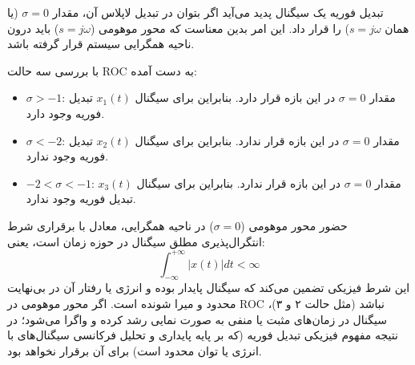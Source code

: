 
تبدیل فوریه یک سیگنال پدید می‌آید اگر بتوان در تبدیل لاپلاس آن، مقدار $\sigma = 0$ (یا همان $s = j\omega$) را قرار داد. این امر بدین معناست که محور موهومی ($s = j\omega$) باید درون ناحیه همگرایی سیستم قرار گرفته باشد.

با بررسی سه حالت ROC به دست آمده:
\begin{itemize}
    \item $\sigma > -1$: مقدار $\sigma = 0$ در این بازه قرار دارد. بنابراین برای سیگنال $x_1(t)$ {تبدیل فوریه وجود دارد}.
    \item $\sigma < -2$: مقدار $\sigma = 0$ در این بازه قرار ندارد. بنابراین برای سیگنال $x_2(t)$ {تبدیل فوریه وجود ندارد}.
    \item $-2 < \sigma < -1$: مقدار $\sigma = 0$ در این بازه قرار ندارد. بنابراین برای سیگنال $x_3(t)$ {تبدیل فوریه وجود ندارد}.
\end{itemize}

حضور محور موهومی ($\sigma = 0$) در ناحیه همگرایی، معادل با برقراری شرط {انتگرال‌پذیری مطلق} سیگنال در حوزه زمان است، یعنی:
\[
\int_{-\infty}^{+\infty} |x(t)| dt < \infty
\]
این شرط فیزیکی تضمین می‌کند که سیگنال پایدار بوده و انرژی یا رفتار آن در بی‌نهایت محدود و میرا شونده است. اگر محور موهومی در ROC نباشد (مثل حالت ۲ و ۳)، سیگنال در زمان‌های مثبت یا منفی به صورت نمایی رشد کرده و واگرا می‌شود؛ در نتیجه مفهوم فیزیکی تبدیل فوریه (که بر پایه پایداری و تحلیل فرکانسی سیگنال‌های با انرژی یا توان محدود است) برای آن برقرار نخواهد بود.
